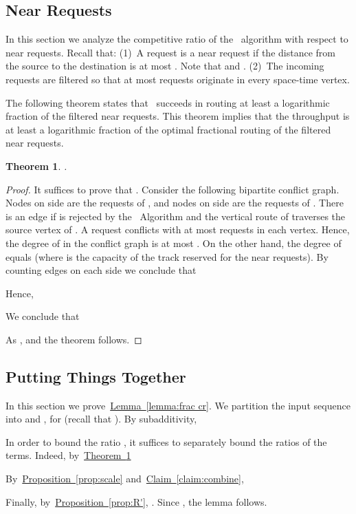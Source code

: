 \documentclass[11pt]{article}
\newtheorem{theorem}{Theorem}
\newcommand{\namedref}[2]{\hyperref[#2]{#1~\ref*{#2}}}
\newcommand{\theoremref}[1]{\namedref{Theorem}{#1}}
\newcommand{\claimref}[1]{\namedref{Claim}{#1}}
\newcommand{\lemmaref}[1]{\namedref{Lemma}{#1}}
\newcommand{\propref}[1]{\namedref{Proposition}{#1}}
\newcommand{\routenear}{\text{\sc{route-near}}\xspace}
\newenvironment{proof sketch}[1]{\noindent {\emph{Proof sketch of #1:}}}{\hfill \qed}
\begin{document}
\subsection{Near Requests}
In this section we analyze the competitive ratio of the \routenear\ algorithm with
respect to near requests.  Recall that: (1)~A request is a near request if
the distance from the source to the destination is at most . Note that
 and .  (2)~The
incoming requests are filtered so that at most  requests originate in every
space-time vertex.

The following theorem states that \routenear\ succeeds in routing at least a
logarithmic fraction of the filtered near requests. This theorem implies that the
throughput is at least a logarithmic fraction of the optimal fractional routing of
the filtered near requests.
\begin{theorem} \label{thm:near}
.
\end{theorem}
\begin{proof}\sloppy
  It suffices to prove that .  Consider the following bipartite conflict graph.  Nodes on
  side  are the requests of , and nodes on side  are the requests of
  .  There is an edge  if  is
  rejected by the \routenear\ Algorithm and the vertical route of  traverses the
  source vertex  of .  A request  conflicts with at most
   requests in each vertex. Hence, the degree of  in the conflict graph is
  at most .  On the other hand, the degree of  equals 
  (where  is the capacity of the track reserved for the near requests).
  \medskip\noindent By counting edges on each side we conclude that

Hence,

We conclude that

As ,
and the theorem follows.
\end{proof}

\subsection{Putting Things Together}\label{sec:ptt}\label{sec:together}
In this section we prove~\lemmaref{lemma:frac cr}.  We partition the input sequence
 into  and , for   (recall that
). By subadditivity,

In order to bound the ratio , it suffices to
separately bound the ratios of the terms. Indeed, by~\theoremref{thm:near}
 
By~\propref{prop:scale} and~\claimref{claim:combine},

Finally, by~\propref{prop:R'}, .
Since , the lemma follows.
\end{document}
